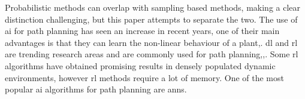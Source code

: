 Probabilistic methods can overlap with sampling based methods, making a clear distinction challenging, but this paper attempts to separate the two.
The use of \ac{ai} for path planning has seen an increase in recent years, one of their main advantages is that they can learn the non-linear behaviour of a plant\:\cite{katona_obstacle_2024},\cite{borkar_stability_2023}. 
\ac{dl} and \ac{rl} are trending research areas and are commonly used for path planning\:\cite{cai_mobile_2021},\cite{katona_obstacle_2024},\cite{borkar_stability_2023}. Some \ac{rl} algorithms have obtained promising results in densely populated dynamic environments\:\cite{chen_socially_2018}, however \ac{rl} methods require a lot of memory\:\cite{cai_mobile_2021}.
One of the most popular \ac{ai} algorithms for path planning are \acp{ann}\:\cite{borkar_stability_2023}.

